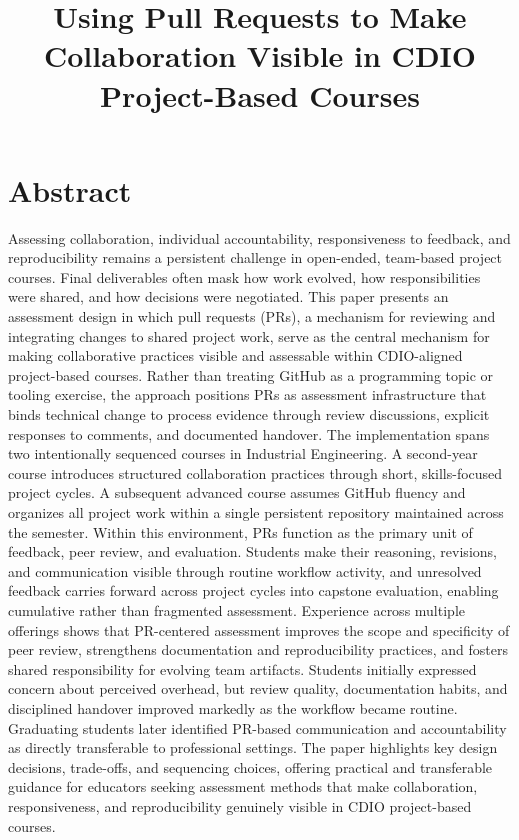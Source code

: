 \documentclass[11pt]{cdio}
\title{Using Pull Requests to Make Collaboration Visible in CDIO Project-Based Courses}
\begin{document}

\section{Abstract}
Assessing collaboration, individual accountability, responsiveness to feedback, and reproducibility remains a persistent challenge in open-ended, team-based project courses. Final deliverables often mask how work evolved, how responsibilities were shared, and how decisions were negotiated. This paper presents an assessment design in which pull requests (PRs), a mechanism for reviewing and integrating changes to shared project work, serve as the central mechanism for making collaborative practices visible and assessable within CDIO-aligned project-based courses. Rather than treating GitHub as a programming topic or tooling exercise, the approach positions PRs as assessment infrastructure that binds technical change to process evidence through review discussions, explicit responses to comments, and documented handover.
The implementation spans two intentionally sequenced courses in Industrial Engineering. A second-year course introduces structured collaboration practices through short, skills-focused project cycles. A subsequent advanced course assumes GitHub fluency and organizes all project work within a single persistent repository maintained across the semester. Within this environment, PRs function as the primary unit of feedback, peer review, and evaluation. Students make their reasoning, revisions, and communication visible through routine workflow activity, and unresolved feedback carries forward across project cycles into capstone evaluation, enabling cumulative rather than fragmented assessment.
Experience across multiple offerings shows that PR-centered assessment improves the scope and specificity of peer review, strengthens documentation and reproducibility practices, and fosters shared responsibility for evolving team artifacts. Students initially expressed concern about perceived overhead, but review quality, documentation habits, and disciplined handover improved markedly as the workflow became routine. Graduating students later identified PR-based communication and accountability as directly transferable to professional settings.
The paper highlights key design decisions, trade-offs, and sequencing choices, offering practical and transferable guidance for educators seeking assessment methods that make collaboration, responsiveness, and reproducibility genuinely visible in CDIO project-based courses.
\end{document}
